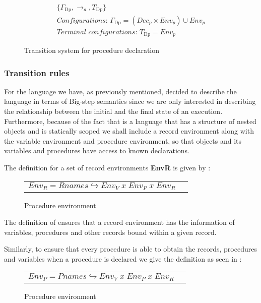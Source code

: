 \begin{figure}[htbp]
	\begin{gather*} 
		\{ \Gamma_\text{Dp}, \rightarrow_a, T_\text{Dp} \} \\ 
		\textit{Configurations: } \Gamma_\text{Dp} = (Dec_p \times Env_p) \cup Env_p \\ 
		\textit{Terminal configurations: } T_\text{Dp} = Env_p
	\end{gather*} 
	\caption{Transition system for procedure declaration}
	\label{fig:TSDecp}
\end{figure}

\subsubsection*{Transition rules}
For the language \dazel{} we have, as previously mentioned, decided to describe the language in terms of Big-step semantics since we are only interested in describing the relationship between the initial and the final state of an execution\cite{SemanWithApplications}. Furthermore, because of the fact that \dazel{} is a language that has a structure of nested objects and is statically scoped we shall include a record environment along with the variable environment and procedure environment, so that objects and its variables and procedures have access to known declarations.

The definition for a set of record environments \textbf{EnvR} is given by :

\begin{figure}[h]
	\centering
	\begin{tabular}{l l}
		$Env_R = Rnames \hookrightarrow Env_V \; x \; Env_P \; x \; Env_R$
	\end{tabular}
	\caption{Procedure environment}
	\label{fig:EnvRDef}
\end{figure}

The definition of  ensures that a record environment has the information of variables, procedures and other records bound within a given record.

Similarly, to ensure that every procedure is able to obtain the records, procedures and variables when a procedure is declared we give the definition as seen in :

\begin{figure}[h]
	\centering
	\begin{tabular}{l l}
		$Env_P = Pnames \hookrightarrow Env_V \; x \; Env_P \; x \; Env_R$
	\end{tabular}
	\caption{Procedure environment}
	\label{fig:EnvPDef}
\end{figure}

